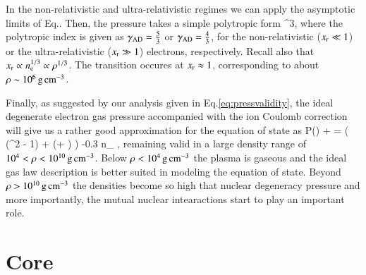 In the non-relativistic and ultra-relativistic regimes we can apply the asymptotic limits of Eq..
Then, the pressure  takes a simple polytropic form
\be
\Peid \approx \frac{ \Pressr }{9\pi^2 \gammaad} \xr^{3\gammaad},
\ee
where the polytropic index is given as $\gamma_{\mathrm{AD}} = \frac{5}{3}$ or $\gamma_{\mathrm{AD}} = \frac{4}{3}$, for the non-relativistic ($x_{\mathrm{r}} \ll 1$) or the ultra-relativistic ($x_{\mathrm{r}} \gg 1$) electrons, respectively.
Recall also that $x_{\mathrm{r}} \propto n_{\mathrm{e}}^{1/3} \propto \rho^{1/3}$.
The transition occures at $x_{\mathrm{r}} \approx 1$, corresponding to about $\rho \sim 10^6 \, \mathrm{g}\,\mathrm{cm}^{-3}$.

Finally, as suggested by our analysis given in Eq.\eqref{eq:pressvalidity}, the ideal degenerate electron gas pressure accompanied with the ion Coulomb correction will give us a rather good approximation for the equation of state as
\be
P(\xr) \approx \Peid + \Pii =  \left( (\xr^2 - 1) \gammar + \ln(\xr + \gammar) \right) -0.3 n_{} ,
\ee
remaining valid in a large density range of $10^{4} < \rho < 10^{10} \, \mathrm{g}\,\mathrm{cm}^{-3}$.
Below $\rho < 10^{4} \, \mathrm{g}\,\mathrm{cm}^{-3}$ the plasma is gaseous and the ideal gas law description  is better suited in modeling the equation of state.
Beyond $\rho > 10^{10} \, \mathrm{g}\,\mathrm{cm}^{-3}$ the densities become so high that nuclear degeneracy pressure and more importantly, the mutual nuclear intearactions start to play an important role.


%







\section{Core}\label{sect:core}

